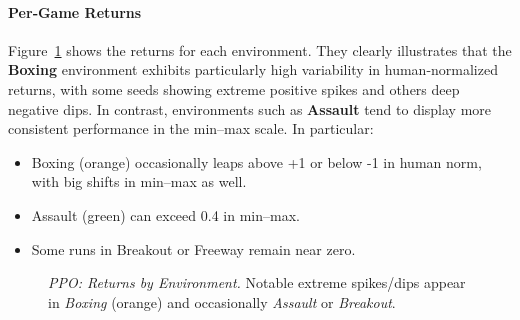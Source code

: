 \paragraph{Per‐Game Returns}
Figure~\ref{fig:ppo_returns_pergame} shows the returns for each environment. They clearly illustrates that the \textbf{Boxing} environment exhibits particularly high variability in human-normalized returns, with some seeds showing extreme positive spikes and others deep negative dips. In contrast, environments such as \textbf{Assault} tend to display more consistent performance in the min--max scale. In particular:
\begin{itemize}
	\item Boxing (orange) occasionally leaps above +1 or below -1 in human norm,
	with big shifts in min--max as well.
	\item Assault (green) can exceed 0.4 in min--max.
	\item Some runs in Breakout or Freeway remain near zero.
\end{itemize}

\begin{figure} 
	\centering
	\quad
	\caption{\emph{PPO: Returns by Environment.} 
		Notable extreme spikes/dips appear in \emph{Boxing} (orange) 
		and occasionally \emph{Assault} or \emph{Breakout}.}
	\label{fig:ppo_returns_pergame}
\end{figure}


